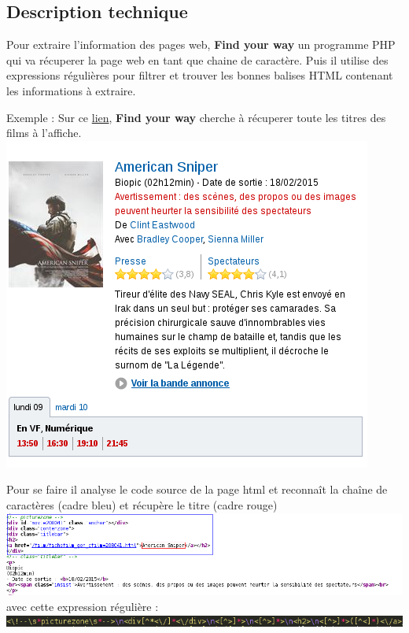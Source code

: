 \documentclass[10pt,a4paper]{report}
\begin{document}
\subsection{Description technique}
\begin{flushleft}
Pour extraire l'information des pages web, \textbf{Find your way} un programme PHP qui va récuperer la page web en tant que chaine de caractère. Puis il utilise des expressions régulières pour filtrer et trouver les bonnes balises HTML contenant les informations à extraire.\newline

Exemple :
 Sur ce \href{http://www.allocine.fr/seance/salle_gen_csalle=P0231.html}{lien}, \textbf{Find your way} cherche à récuperer toute les titres des films à l'affiche. \\
 \includegraphics[scale=0.45]{./images/allocine_img1.png}
 
 Pour se faire il analyse le code source de la page html et reconnaît la chaîne de caractères (cadre bleu)  et récupère le titre (cadre rouge)\\
  \includegraphics[scale=0.45]{./images/allocine_img2.png}
 avec cette expression régulière : \\
 \includegraphics[scale=0.45]{./images/allocine_img3.png}
\end{flushleft}
\end{document}
